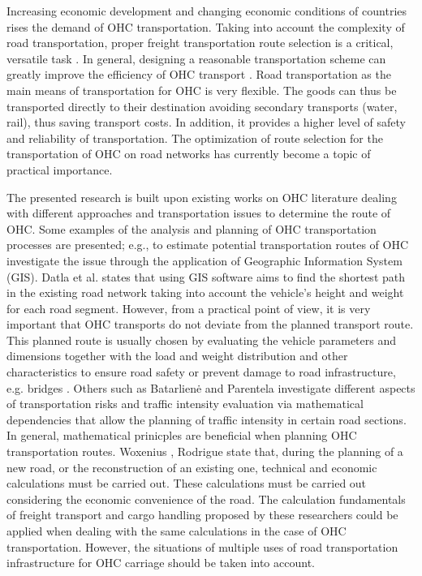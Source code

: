 %

Increasing economic development and changing economic conditions of countries rises the demand of OHC transportation.
Taking into account the complexity of road transportation, proper freight transportation route selection is a critical, versatile task \cite{Bazaras.2013, xu2001methodology, sivilevicius2007dynamics}.
 In general, designing a reasonable transportation scheme can greatly improve the efficiency of OHC transport \cite{meng2015optimized}.
 Road transportation as the main means of transportation for OHC is very flexible.
  The goods can thus be transported directly to their destination avoiding secondary transports (water, rail), thus saving transport costs.
   In addition, it provides a higher level of safety and reliability of transportation.
   The optimization of route selection for the transportation of OHC on road networks has currently become a topic of practical importance\cite{geisberger2011efficient}.
\par
 The presented research is built upon existing works on OHC literature dealing with different approaches and transportation issues to determine the route of OHC.
 Some examples of the analysis and planning of OHC transportation processes are presented; e.g., to estimate potential transportation routes of OHC \cite{durham2002gis} investigate the issue through the application of Geographic Information System (GIS).
 Datla et al. \cite{datla2004gis} states that using GIS software aims to find the shortest path in the existing road network taking into account the vehicle’s height and weight for each road segment. However, from a practical point of view, it is very important that OHC transports do not deviate from the planned transport route.
  This planned route is usually chosen by evaluating the vehicle parameters and dimensions together with the load and weight distribution and other characteristics to ensure road safety or prevent damage to road infrastructure, e.g. bridges \cite{ecmt2006improving, vaitkus2016effect, kombe2017modelling, pauer2017development}.
Others such as Batarlienė \cite{batarliene2007mobile} and Parentela \cite{parentela2002risk} investigate different aspects of transportation risks and traffic intensity evaluation via mathematical dependencies that allow the planning of traffic intensity in certain road sections.
In general, mathematical prinicples are beneficial when planning OHC transportation routes.
Woxenius \cite{woxenius2002organisation, woxenius2002conceptual}, Rodrigue \cite{rodrigue2020geography} state that, during the planning of a new road, or the reconstruction of an existing one, technical and economic calculations must be carried out.
These calculations must be carried out considering the economic convenience of the road.
The calculation fundamentals of freight transport and cargo handling proposed by these researchers could be applied when dealing with the same calculations in the case of OHC transportation. However, the situations of multiple uses of road transportation infrastructure for OHC carriage should be taken into account.

